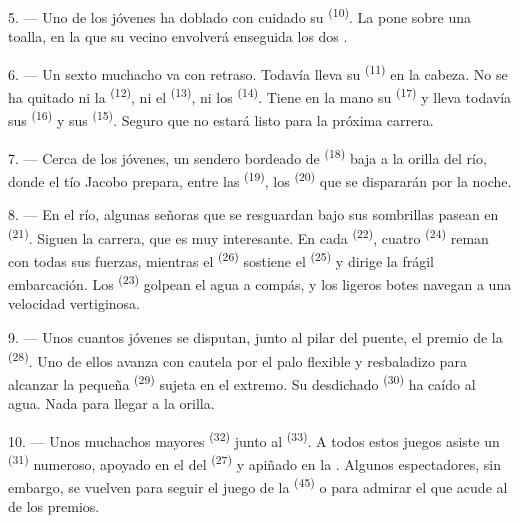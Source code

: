 5. --- Uno de los jóvenes ha doblado con cuidado su 
\textsuperscript{(10)}. La pone sobre una toalla, en la que su vecino envolverá
enseguida los dos .

6. --- Un sexto muchacho va con retraso. Todavía lleva su 
\textsuperscript{(11)} en la cabeza. No se ha quitado ni la 
\textsuperscript{(12)}, ni el  \textsuperscript{(13)}, ni los
 \textsuperscript{(14)}. Tiene en la mano su 
\textsuperscript{(17)} y lleva todavía sus  \textsuperscript{(16)} y sus
 \textsuperscript{(15)}. Seguro que no estará listo para la
próxima carrera.

7. --- Cerca de los jóvenes, un sendero bordeado de 
\textsuperscript{(18)} baja a la orilla del río, donde el tío Jacobo prepara,
entre las  \textsuperscript{(19)}, los 
\textsuperscript{(20)} que se dispararán por la noche.

\VUsaut{4.4mm}
\VUsaut{3.4mm}

8. --- En el río, algunas señoras que se resguardan bajo sus sombrillas
pasean en  \textsuperscript{(21)}. Siguen la carrera, que es muy
interesante. En cada  \textsuperscript{(22)}, cuatro 
\textsuperscript{(24)} reman con todas sus fuerzas, mientras el 
\textsuperscript{(26)} sostiene el  \textsuperscript{(25)} y dirige la frágil
embarcación. Los  \textsuperscript{(23)} golpean el agua a compás, y
los ligeros botes navegan a una velocidad vertiginosa.

9. --- Unos cuantos jóvenes se disputan, junto al pilar del puente, el
premio de la  \textsuperscript{(28)}. Uno de ellos avanza
con cautela por el palo flexible y resbaladizo para alcanzar la pequeña
 \textsuperscript{(29)} sujeta en el extremo. Su desdichado
 \textsuperscript{(30)} ha caído al agua. Nada para llegar a la
orilla.

10. --- Unos muchachos mayores  \textsuperscript{(32)} junto
al  \textsuperscript{(33)}. A todos estos juegos asiste un
 \textsuperscript{(31)} numeroso, apoyado en el  del
 \textsuperscript{(27)} y apiñado en la . Algunos
espectadores, sin embargo, se vuelven para seguir el juego de la
 \textsuperscript{(45)} o para admirar el 
que acude al  de los premios.


